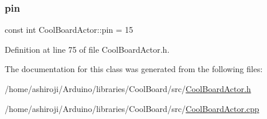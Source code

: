 \mbox{\label{class_cool_board_actor_a8b5c0b41fe6033b68d9e1ed00bc2e122}} 
\subsubsection{\texorpdfstring{pin}{pin}}
{\footnotesize\ttfamily const int Cool\+Board\+Actor\+::pin = 15\hspace{0.3cm}{\ttfamily [private]}}



Definition at line 75 of file Cool\+Board\+Actor.\+h.



The documentation for this class was generated from the following files\+:\begin{DoxyCompactItemize}
\item 
/home/ashiroji/\+Arduino/libraries/\+Cool\+Board/src/\hyperlink{_cool_board_actor_8h}{Cool\+Board\+Actor.\+h}\item 
/home/ashiroji/\+Arduino/libraries/\+Cool\+Board/src/\hyperlink{_cool_board_actor_8cpp}{Cool\+Board\+Actor.\+cpp}\end{DoxyCompactItemize}

